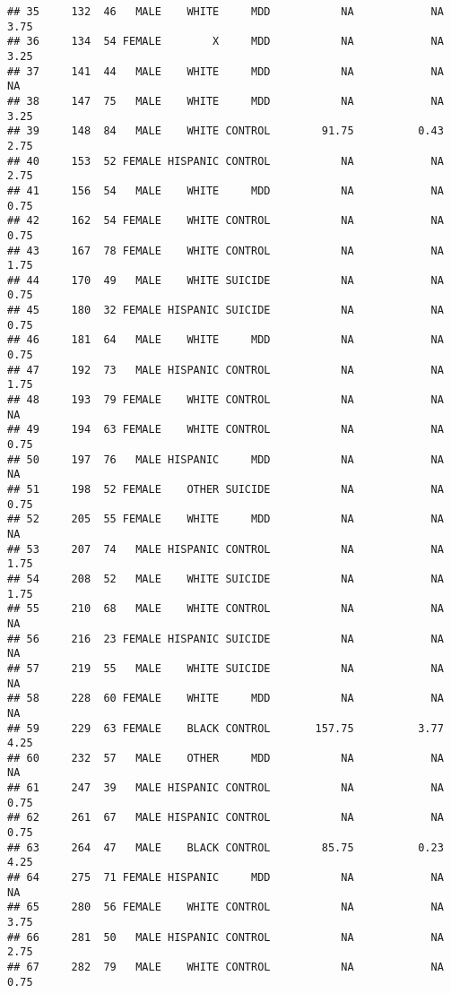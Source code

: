 \documentclass[]{article}
\begin{document}
\begin{verbatim}
## 35     132  46   MALE    WHITE     MDD           NA            NA        3.75
## 36     134  54 FEMALE        X     MDD           NA            NA        3.25
## 37     141  44   MALE    WHITE     MDD           NA            NA          NA
## 38     147  75   MALE    WHITE     MDD           NA            NA        3.25
## 39     148  84   MALE    WHITE CONTROL        91.75          0.43        2.75
## 40     153  52 FEMALE HISPANIC CONTROL           NA            NA        2.75
## 41     156  54   MALE    WHITE     MDD           NA            NA        0.75
## 42     162  54 FEMALE    WHITE CONTROL           NA            NA        0.75
## 43     167  78 FEMALE    WHITE CONTROL           NA            NA        1.75
## 44     170  49   MALE    WHITE SUICIDE           NA            NA        0.75
## 45     180  32 FEMALE HISPANIC SUICIDE           NA            NA        0.75
## 46     181  64   MALE    WHITE     MDD           NA            NA        0.75
## 47     192  73   MALE HISPANIC CONTROL           NA            NA        1.75
## 48     193  79 FEMALE    WHITE CONTROL           NA            NA          NA
## 49     194  63 FEMALE    WHITE CONTROL           NA            NA        0.75
## 50     197  76   MALE HISPANIC     MDD           NA            NA          NA
## 51     198  52 FEMALE    OTHER SUICIDE           NA            NA        0.75
## 52     205  55 FEMALE    WHITE     MDD           NA            NA          NA
## 53     207  74   MALE HISPANIC CONTROL           NA            NA        1.75
## 54     208  52   MALE    WHITE SUICIDE           NA            NA        1.75
## 55     210  68   MALE    WHITE CONTROL           NA            NA          NA
## 56     216  23 FEMALE HISPANIC SUICIDE           NA            NA          NA
## 57     219  55   MALE    WHITE SUICIDE           NA            NA          NA
## 58     228  60 FEMALE    WHITE     MDD           NA            NA          NA
## 59     229  63 FEMALE    BLACK CONTROL       157.75          3.77        4.25
## 60     232  57   MALE    OTHER     MDD           NA            NA          NA
## 61     247  39   MALE HISPANIC CONTROL           NA            NA        0.75
## 62     261  67   MALE HISPANIC CONTROL           NA            NA        0.75
## 63     264  47   MALE    BLACK CONTROL        85.75          0.23        4.25
## 64     275  71 FEMALE HISPANIC     MDD           NA            NA          NA
## 65     280  56 FEMALE    WHITE CONTROL           NA            NA        3.75
## 66     281  50   MALE HISPANIC CONTROL           NA            NA        2.75
## 67     282  79   MALE    WHITE CONTROL           NA            NA        0.75

\end{verbatim}
\end{document}
